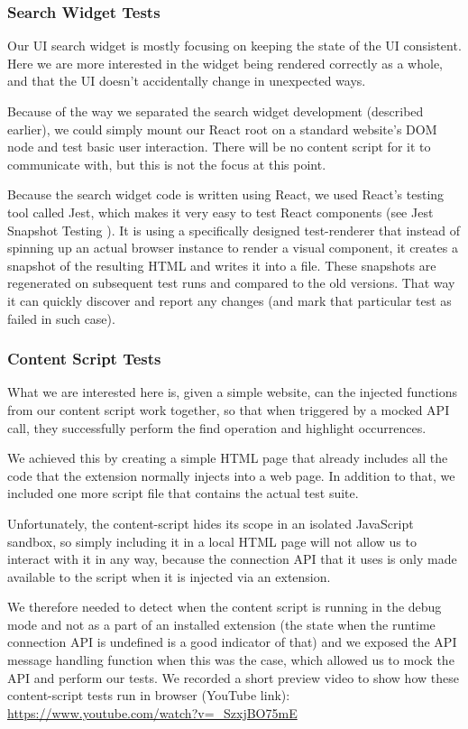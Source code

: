 \documentclass[bsc,frontabs,twoside,singlespacing,parskip,deptreport]{infthesis}
\begin{document}
\subsubsection{Search Widget Tests}
Our UI search widget is mostly focusing on keeping the state of the UI consistent. Here we are more interested in the widget being rendered correctly as a whole, and that the UI doesn't accidentally change in unexpected ways.

Because of the way we separated the search widget development (described earlier), we could simply mount our React root on a standard website's DOM node and test basic user interaction. There will be no content script for it to communicate with, but this is not the focus at this point.

Because the search widget code is written using React, we used React's testing tool called Jest, which makes it very easy to test React components (see Jest Snapshot Testing \cite{A13}). It is using a specifically designed test-renderer that instead of spinning up an actual browser instance to render a visual component, it creates a snapshot of the resulting HTML and writes it into a file. These snapshots are regenerated on subsequent test runs and compared to the old versions. That way it can quickly discover and report any changes (and mark that particular test as failed in such case).

\subsubsection{Content Script Tests}
What we are interested here is, given a simple website, can the injected functions from our content script work together, so that when triggered by a mocked API call, they successfully perform the find operation and highlight occurrences.

We achieved this by creating a simple HTML page that already includes all the code that the extension normally injects into a web page. In addition to that, we included one more script file that contains the actual test suite.

Unfortunately, the content-script hides its scope in an isolated JavaScript sandbox, so simply including it in a local HTML page will not allow us to interact with it in any way, because the connection API that it uses is only made available to the script when it is injected via an extension.

We therefore needed to detect when the content script is running in the debug mode and not as a part of an installed extension (the state when the runtime connection API is undefined is a good indicator of that) and we exposed the API message handling function when this was the case, which allowed us to mock the API and perform our tests. We recorded a short preview video to show how these content-script tests run in browser (YouTube link): \url{https://www.youtube.com/watch?v=_SzxjBO75mE}
\end{document}
